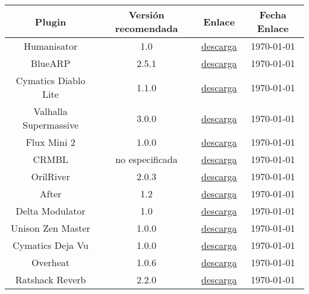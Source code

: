 \begin{table}[h]
    \centering
	\begin{tabular}{c|c|c|c}
		\textbf{Plugin} & \textbf{Versión recomendada} & \textbf{Enlace} & \textbf{Fecha Enlace} \\
		\hline\hline
		Humanisator & 1.0 & \href{https://plugins4free.com/plugin/1562/}{descarga} & \today\\
		BlueARP & 2.5.1 & \href{https://omg-instruments.com/wp/}{descarga} & \today\\
		Cymatics Diablo Lite & 1.1.0 & \href{https://cymatics.fm/pages/diablo-lite}{descarga} & \today\\	
            Valhalla Supermassive & 3.0.0 & \href{https://valhalladsp.com/shop/reverb/valhalla-supermassive/}{descarga} & \today\\

            Flux Mini 2 & 1.0.0 & \href{https://www.caelumaudio.com/CaelumAudio/?Page=FluxMini2}{descarga} & \today\\
            
            CRMBL & no especificada & \href{https://vst.unplug.red/crmbl}{descarga} & \today\\
            
            OrilRiver & 2.0.3 & \href{https://plugins4free.com/plugin/2538/}{descarga} & \today\\
            
            After & 1.2 & \href{https://plugins4free.com/plugin/1728/}{descarga} & \today\\
            
            Delta Modulator & 1.0 & \href{https://plugins4free.com/plugin/1225/}{descarga} & \today\\
            
            Unison Zen Master & 1.0.0 & \href{https://unison.audio/zen-master}{descarga} & \today\\
            
            Cymatics Deja Vu & 1.0.0 & \href{https://cymatics.fm/products/deja-vu-plugin}{descarga} & \today\\
            
            Overheat & 1.0.6 & \href{https://sampleson.com/overheat.html}{descarga} & \today\\
            
            Ratshack Reverb & 2.2.0 & \href{https://plugins4free.com/plugin/3729/}{descarga} & \today\\
            

\end{tabular}
\end{table}
